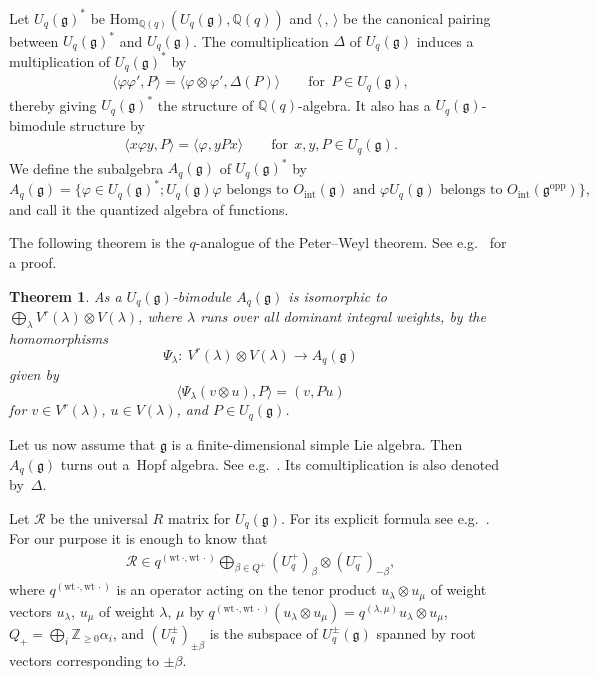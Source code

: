 \documentclass[11pt]{article}
\newtheorem{theorem}{Theorem}
\newcommand{\geh}{\mathfrak{g}}
\newcommand{\la}{\lambda}
\newcommand{\ot}{\otimes}
\newcommand{\pair}[1]{\langle{#1}\rangle}
\newcommand{\Z}{{\mathbb Z}}
\newcommand{\Q}{{\mathbb Q}}
\begin{document}
Let $U_q(\geh)^*$ be $\mathrm{Hom}_{\Q(q)}(U_q(\geh),\Q(q))$ and $\pair{\,,\,}$ be the canonical
pairing between $U_q(\geh)^*$ and $U_q(\geh)$. The comultiplication $\Delta$ of $U_q(\geh)$ induces
a multiplication of $U_q(\geh)^*$ by
\begin{gather}\label{eq:mult}
\pair{\varphi\varphi',P}=\pair{\varphi\otimes\varphi',\Delta(P)}\qquad\text{for} \ \ P\in U_q(\geh),
\end{gather}
thereby giving $U_q(\geh)^*$ the structure of $\Q(q)$-algebra. It also has a $U_q(\geh)$-bimodule structure
by
\begin{gather}\label{eq:bimodule}
\pair{x\varphi y,P}=\pair{\varphi,yPx}\qquad\text{for} \ \ x,y,P\in U_q(\geh).
\end{gather}
We def\/ine the subalgebra $A_q(\geh)$ of $U_q(\geh)^*$ by
\[
A_q(\geh)=\big\{\varphi\in U_q(\geh)^*;U_q(\geh)\varphi\text{ belongs to }O_\mathrm{int}(\geh)\text{ and }
\varphi U_q(\geh)\text{ belongs to }O_\mathrm{int}(\geh^\mathrm{opp})\big\},
\]
and call it the quantized algebra of functions.

The following theorem is the $q$-analogue of the Peter--Weyl theorem.
See e.g.~\cite{Kas93}  for a proof.

\begin{theorem}\label{th:peter}
As a $U_q(\geh)$-bimodule $A_q(\geh)$ is isomorphic to $\bigoplus_\la V^r(\la)\ot V(\la)$, where $\la$ runs
over all dominant integral weights, by the homomorphisms
\[
\Psi_\la: \ V^r(\la)\ot V(\la)\rightarrow A_q(\geh)
\]
given by
\[
\langle \Psi_\la(v\ot u),P\rangle = (v,Pu)
\]
for $v\in V^r(\la)$, $u\in V(\la)$, and $P\in U_q(\geh)$.
\end{theorem}

Let us now assume that $\geh$ is a f\/inite-dimensional simple Lie algebra. Then $A_q(\geh)$ turns out
a~Hopf algebra. See e.g.~\cite[Chapter~9]{Joseph}. Its comultiplication is also denoted by~$\Delta$.

Let $\mathcal{R}$ be the
universal $R$ matrix for $U_q(\geh)$. For its explicit formula see e.g.~\cite[p.~273]{CPbook}. For our purpose
it is enough to know that
\begin{gather}\label{eq:univR}
\mathcal{R}\in q^{(\text{wt}\,\cdot,\text{wt}\,\cdot)}
\bigoplus_{\beta\in Q^+}(U_q^+)_\beta\ot(U_q^-)_{-\beta},
\end{gather}
where $q^{(\text{wt}\,\cdot,\text{wt}\,\cdot)}$ is an operator acting on
the tenor product $u_\la\ot u_\mu$ of weight vectors $u_\la$, $u_\mu$ of weight $\la$, $\mu$ by
$q^{(\text{wt}\,\cdot,\text{wt}\,\cdot)}(u_\la\ot u_\mu)=q^{(\la,\mu)}
u_\la\ot u_\mu$, $Q_+=\bigoplus_i\Z_{\ge0}\alpha_i$, and $(U_q^\pm)_{\pm\beta}$ is the subspace of
$U_q^\pm(\geh)$ spanned by root vectors corresponding to $\pm\beta$.
\end{document}
